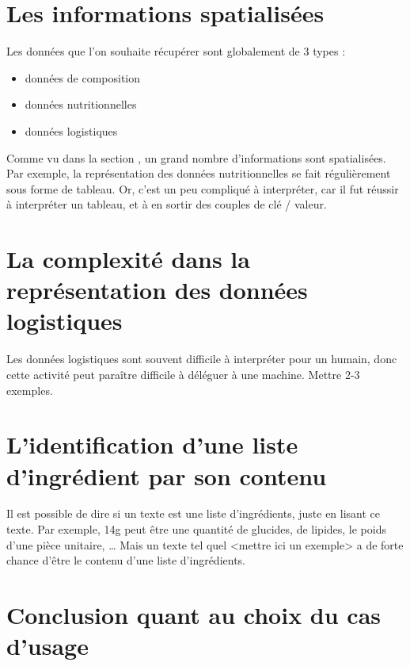        \section{Les informations \og spatialisées \fg}
        Les données que l'on souhaite récupérer sont globalement de 3 types : 
        \begin{itemize}
            \item données de composition
            \item données nutritionnelles
            \item données logistiques
        \end{itemize}

        Comme vu dans la section , un grand nombre d'informations sont spatialisées.
        Par exemple, la représentation des données nutritionnelles se fait régulièrement sous forme de tableau.
        Or, c'est un peu compliqué à interpréter, car il fut réussir à interpréter un tableau, et à en sortir des couples de clé / valeur.

        \section{La complexité dans la représentation des données logistiques}

        Les données logistiques sont souvent difficile à interpréter pour un humain, donc cette activité peut paraître difficile à déléguer à une machine.
        Mettre 2-3 exemples.

        \section{L'identification d'une liste d'ingrédient par son contenu}

        Il est possible de dire si un texte est une liste d'ingrédients, juste en lisant ce texte.
        Par exemple, \og 14g \fg peut être une quantité de glucides, de lipides, le poids d'une pièce unitaire, \dots
        Mais un texte tel quel <mettre ici un exemple> a de forte chance d'être le contenu d'une liste d'ingrédients.

        \section{Conclusion quant au choix du cas d'usage}

